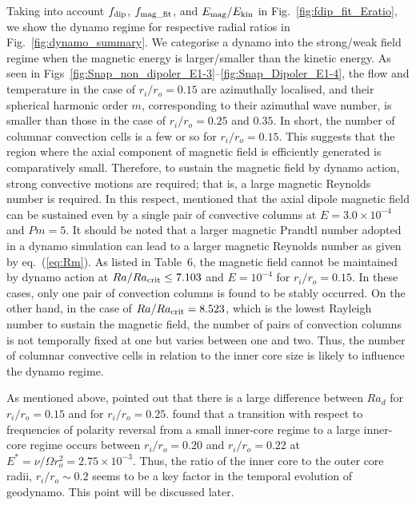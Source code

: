 Taking into account $f_{\rm dip}$, $f_{\rm mag\_fit}$, and $E_{\rm mag}/E_{\rm kin}$ in Fig.~\ref{fig:fdip_fit_Eratio}, we show the dynamo regime for respective radial ratios in Fig.~\ref{fig:dynamo_summary}.
We categorise a dynamo into the strong/weak field regime when the magnetic energy is larger/smaller than the kinetic energy.
As seen in Figs~\ref{fig:Snap_non_dipoler_E1-3}--\ref{fig:Snap_Dipoler_E1-4}, the flow and temperature in the case of $r_i / r_o = 0.15$ are azimuthally localised, and their spherical harmonic order $m$, corresponding to their azimuthal wave number, is smaller than those in the case of $r_i / r_o = 0.25$ and $0.35$.
In short, the number of columnar convection cells is a few or so for $r_i / r_o = 0.15$.
This suggests that the region where the axial component of magnetic field is efficiently generated is comparatively small.
Therefore, to sustain the magnetic field by dynamo action, strong convective motions are required; that is, a large magnetic Reynolds number is required.
In this respect, \citet{Heimpel:2005} mentioned that the axial dipole magnetic field can be sustained even by a single pair of convective columns at $E = 3.0 \times 10^{-4}$ and $Pm = 5$.
It should be noted that a larger magnetic Prandtl number adopted in a dynamo simulation can lead to a larger magnetic Reynolds number as given by eq.~(\ref{eq:Rm}).
As listed in Table~6, the magnetic field cannot be maintained by dynamo action at $Ra / Ra_{\rm crit} \le 7.103$ and $E = 10^{-4}$ for $r_i / r_o = 0.15$.
In these cases, only one pair of convection columns is found to be stably occurred.
On the other hand, in the case of $Ra / Ra_{\rm crit} = 8.523$, which is the lowest Rayleigh number to sustain the magnetic field, the number of pairs of convection columns is not temporally fixed at one but varies between one and two.
Thus, the number of columnar convective cells in relation to the inner core size is likely to influence the dynamo regime.

As mentioned above, \citet{Heimpel:2005} pointed out that there is a large difference between $Ra_d$ for $r_i / r_o = 0.15$ and for $r_i / r_o = 0.25$.
\citet{Lhuillier:2019} found that a transition with respect to frequencies of polarity reversal from a small inner-core regime to a large inner-core regime occurs between $r_i / r_o = 0.20$ and $r_i / r_o = 0.22$ at $E^* = \nu / \Omega r_o^2 = 2.75 \times 10^{-3}$.
Thus, the ratio of the inner core to the outer core radii, $r_i / r_o \sim 0.2$ seems to be a key factor in the temporal evolution of geodynamo.
This point will be discussed later.

